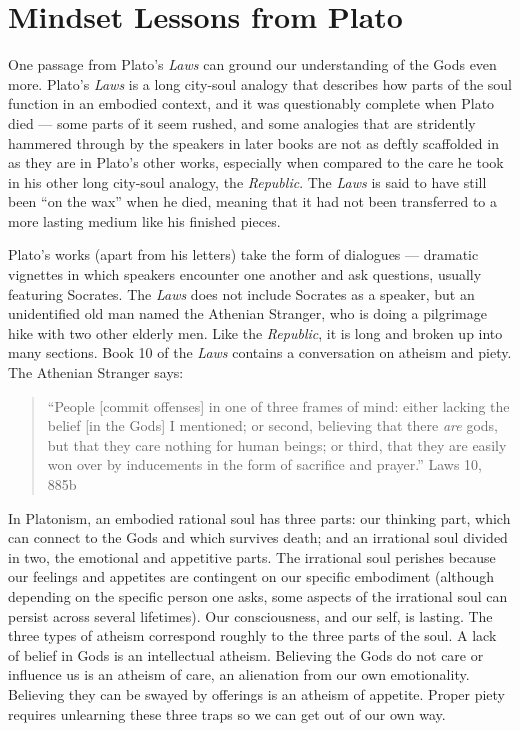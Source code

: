 \documentclass[
]{book}
\begin{document}
\hypertarget{mindset-lessons-from-plato}{%
\section{Mindset Lessons from Plato}\label{mindset-lessons-from-plato}}

One passage from Plato's \emph{Laws} can ground our understanding of the Gods even more. Plato's \emph{Laws} is a long city-soul analogy that describes how parts of the soul function in an embodied context, and it was questionably complete when Plato died --- some parts of it seem rushed, and some analogies that are stridently hammered through by the speakers in later books are not as deftly scaffolded in as they are in Plato's other works, especially when compared to the care he took in his other long city-soul analogy, the \emph{Republic}. The \emph{Laws} is said to have still been ``on the wax'' when he died, meaning that it had not been transferred to a more lasting medium like his finished pieces.

Plato's works (apart from his letters) take the form of dialogues --- dramatic vignettes in which speakers encounter one another and ask questions, usually featuring Socrates. The \emph{Laws} does not include Socrates as a speaker, but an unidentified old man named the Athenian Stranger, who is doing a pilgrimage hike with two other elderly men. Like the \emph{Republic}, it is long and broken up into many sections. Book 10 of the \emph{Laws} contains a conversation on atheism and piety. The Athenian Stranger says:

\begin{quote}
``People {[}commit offenses{]} in one of three frames of mind: either lacking the belief {[}in the Gods{]} I mentioned; or second, believing that there \emph{are} gods, but that they care nothing for human beings; or third, that they are easily won over by inducements in the form of sacrifice and prayer.'' Laws 10, 885b
\end{quote}

In Platonism, an embodied rational soul has three parts: our thinking part, which can connect to the Gods and which survives death; and an irrational soul divided in two, the emotional and appetitive parts. The irrational soul perishes because our feelings and appetites are contingent on our specific embodiment (although depending on the specific person one asks, some aspects of the irrational soul can persist across several lifetimes). Our consciousness, and our self, is lasting. The three types of atheism correspond roughly to the three parts of the soul. A lack of belief in Gods is an intellectual atheism. Believing the Gods do not care or influence us is an atheism of care, an alienation from our own emotionality. Believing they can be swayed by offerings is an atheism of appetite. Proper piety requires unlearning these three traps so we can get out of our own way.
\end{document}
